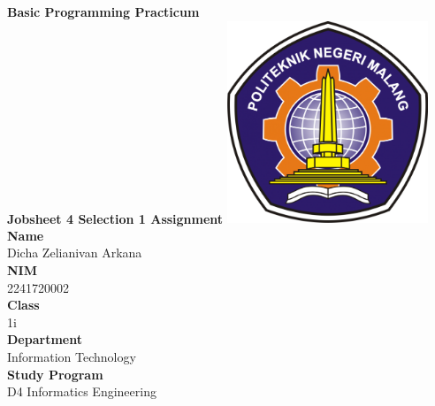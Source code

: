 \documentclass[12pt,titlepage]{article}
\newcommand{\vSubject}{Basic Programming Practicum}
\newcommand{\vSubtitle}{Jobsheet 4 Selection 1 Assignment}
\newcommand{\vName}{Dicha Zelianivan Arkana}
\newcommand{\vNIM}{2241720002}
\newcommand{\vClass}{1i}
\newcommand{\vDepartment}{Information Technology}
\newcommand{\vStudyProgram}{D4 Informatics Engineering}
\begin{document}
\begin{titlepage}
    \centering
    \vfill
    {\bfseries\LARGE
        \vSubject\\
        \vskip0.25cm
        \vSubtitle
    }
    \vfill
    \includegraphics[width=6cm]{images/polinema-logo.png}
    \vfill
    {
        \textbf{Name}\\
        \vName\\
        \vskip0.5cm
        \textbf{NIM}\\
        \vNIM\\
        \vskip0.5cm
        \textbf{Class}\\
        \vClass\\
        \vskip0.5cm
        \textbf{Department}\\
        \vDepartment\\
        \vskip0.5cm
        \textbf{Study Program}\\
        \vStudyProgram
    }
\end{titlepage}
\end{document}
